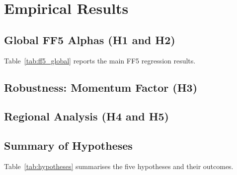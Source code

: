 \section{Empirical Results}
\label{sec:results}

\subsection{Global FF5 Alphas (H1 and H2)}
\label{sec:results-global}


Table~\ref{tab:ff5_global} reports the main FF5 regression results.


\subsection{Robustness: Momentum Factor (H3)}
\label{sec:results-ff6}



\subsection{Regional Analysis (H4 and H5)}
\label{sec:results-regional}



\subsection{Summary of Hypotheses}
\label{sec:results-summary}

Table~\ref{tab:hypotheses} summarises the five hypotheses and their outcomes.

